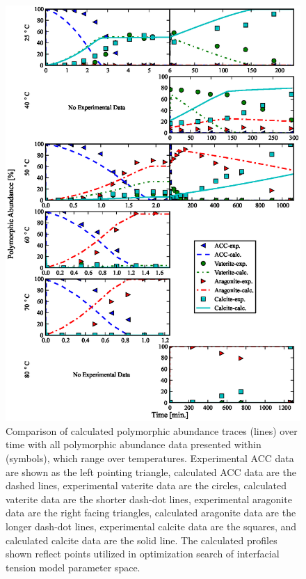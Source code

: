 \documentclass[preprint,3p,a4paper,times,12pt,authoryear]{elsarticle}
\begin{document}
\begin{figure}[!htbp]
\begin{center}
\includegraphics[scale=.85]{fig_8_PA_all_temperatures}
\end{center}
\caption{Comparison of calculated polymorphic abundance traces (lines) over time with all polymorphic abundance data presented within \citep{Ogino1987} (symbols), which range over temperatures.  Experimental ACC data are shown as the left pointing triangle, calculated ACC data are the dashed lines, experimental vaterite data are the circles, calculated vaterite data are the shorter dash-dot lines, experimental aragonite data are the right facing triangles, calculated aragonite data are the longer dash-dot lines, experimental calcite data are the squares, and calculated calcite data are the solid line.  The calculated profiles shown reflect points utilized in optimization search of interfacial tension model parameter space.}  
\label{allTemps}
\end{figure}
\end{document}
